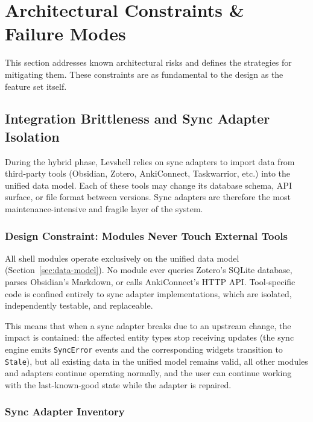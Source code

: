 \documentclass[11pt,a4paper]{article}
\begin{document}
\section{Architectural Constraints \& Failure Modes}
\label{sec:constraints}

This section addresses known architectural risks and defines the strategies for mitigating them. These constraints are as fundamental to the design as the feature set itself.

\subsection{Integration Brittleness and Sync Adapter Isolation}
\label{sec:provider-layer}

During the hybrid phase, Levshell relies on sync adapters to import data from third-party tools (Obsidian, Zotero, AnkiConnect, Taskwarrior, etc.) into the unified data model. Each of these tools may change its database schema, API surface, or file format between versions. Sync adapters are therefore the most maintenance-intensive and fragile layer of the system.

\subsubsection{Design Constraint: Modules Never Touch External Tools}

All shell modules operate exclusively on the unified data model (Section~\ref{sec:data-model}). No module ever queries Zotero's SQLite database, parses Obsidian's Markdown, or calls AnkiConnect's HTTP API. Tool-specific code is confined entirely to sync adapter implementations, which are isolated, independently testable, and replaceable.

This means that when a sync adapter breaks due to an upstream change, the impact is contained: the affected entity types stop receiving updates (the sync engine emits \texttt{SyncError} events and the corresponding widgets transition to \texttt{Stale}), but all existing data in the unified model remains valid, all other modules and adapters continue operating normally, and the user can continue working with the last-known-good state while the adapter is repaired.

\subsubsection{Sync Adapter Inventory}
\end{document}
